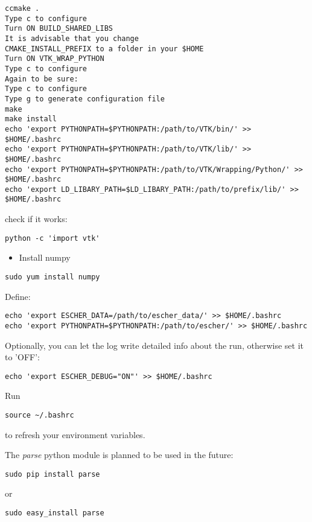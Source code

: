 \documentclass[a4paper]{article}
\begin{document}
%
\asciilist
\begin{lstlisting}
ccmake .
Type c to configure
Turn ON BUILD_SHARED_LIBS
It is advisable that you change
CMAKE_INSTALL_PREFIX to a folder in your $HOME
Turn ON VTK_WRAP_PYTHON
Type c to configure
Again to be sure:
Type c to configure
Type g to generate configuration file
make
make install
echo 'export PYTHONPATH=$PYTHONPATH:/path/to/VTK/bin/' >> $HOME/.bashrc
echo 'export PYTHONPATH=$PYTHONPATH:/path/to/VTK/lib/' >> $HOME/.bashrc
echo 'export PYTHONPATH=$PYTHONPATH:/path/to/VTK/Wrapping/Python/' >> $HOME/.bashrc
echo 'export LD_LIBARY_PATH=$LD_LIBARY_PATH:/path/to/prefix/lib/' >> $HOME/.bashrc
\end{lstlisting}

check if it works:
%
\asciilist
\begin{lstlisting}
python -c 'import vtk'
\end{lstlisting}
%
\begin{itemize}

\item Install numpy

\end{itemize}
%
\asciilist
\begin{lstlisting}
sudo yum install numpy
\end{lstlisting}

Define:
%
\asciilist
\begin{lstlisting}
echo 'export ESCHER_DATA=/path/to/escher_data/' >> $HOME/.bashrc
echo 'export PYTHONPATH=$PYTHONPATH:/path/to/escher/' >> $HOME/.bashrc
\end{lstlisting}

Optionally, you can let the log write detailed info about the run,
otherwise set it to 'OFF':
%
\asciilist
\begin{lstlisting}
echo 'export ESCHER_DEBUG="ON"' >> $HOME/.bashrc
\end{lstlisting}

Run
%
\asciilist
\begin{lstlisting}
source ~/.bashrc
\end{lstlisting}

to refresh your environment variables.

The \emph{parse} python module is planned to be used in the future:
%
\asciilist
\begin{lstlisting}
sudo pip install parse
\end{lstlisting}

or
%
\asciilist
\begin{lstlisting}
sudo easy_install parse
\end{lstlisting}
\end{document}
